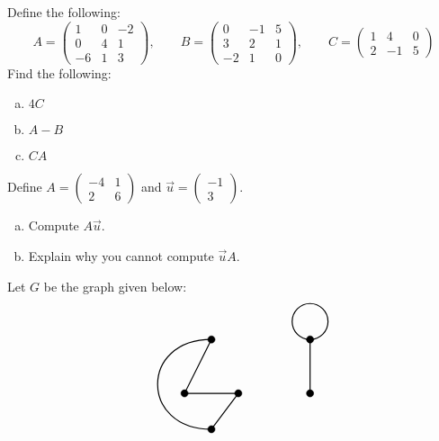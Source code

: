 \documentclass[12pt,letterpaper]{exam}
\begin{document}
\begin{questions}
\newpage
\question[10] Define the following:
	\[
	A= 
	\begin{pmatrix}
	1 & 0 & -2 \\
	0 & 4 & 1 \\
	-6 & 1 & 3
	\end{pmatrix},
	\qquad
	B= 
	\begin{pmatrix}
	0 & -1 & 5 \\
	3 & 2 & 1 \\
	-2 & 1 & 0 
	\end{pmatrix},
	\qquad
	C= 
	\begin{pmatrix}
	1 & 4 & 0 \\
	2 & -1 & 5 
	\end{pmatrix}
	\]
Find the following:
	\begin{enumerate}[(a)]
	\item $4C$
	\item $A - B$
	\item $CA$
	\end{enumerate}



\newpage
\question[10] Define $A= \begin{pmatrix} -4 & 1 \\ 2 & 6 \end{pmatrix}$ and $\vec{u}= \begin{pmatrix} -1 \\ 3 \end{pmatrix}$. 
	\begin{enumerate}[(a)]
	\item Compute $A \vec{u}$.
	\item Explain why you cannot compute $\vec{u} A$. 
	\end{enumerate}



\newpage
\question[10] Let $G$ be the graph given below:
	\[
	\begin{tikzpicture}
	\draw[line width=0.03cm] (0.75,-1) -- (1.5,0) -- (0,0) -- (0.75,1.5);
	\draw[line width=0.03cm] (0.75,1.5) to[bend right=90, distance=2cm] (0.75,-1);
	
	\draw[line width=0.03cm] (3.5,0) -- (3.5,1.5);
	\draw[line width=0.03cm] (3.5,2) circle (0.5);
	
	\draw[fill=black] (0,0) circle (0.1); 
	\draw[fill=black] (1.5,0) circle (0.1); 
	\draw[fill=black] (0.75,1.5) circle (0.1); 
	\draw[fill=black] (0.75,-1) circle (0.1); 
	
	\draw[fill=black] (3.5,0) circle (0.1); 
	\draw[fill=black] (3.5,1.5) circle (0.1); 
	

\end{tikzpicture}\]
\end{questions}
\end{document}
